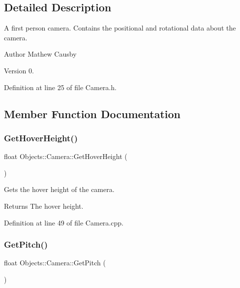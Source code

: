 \subsection{Detailed Description}
A first person camera. Contains the positional and rotational data about the camera. \begin{DoxyAuthor}{Author}
Mathew Causby 
\end{DoxyAuthor}
\begin{DoxyVersion}{Version}
0. 
\end{DoxyVersion}


Definition at line 25 of file Camera.\+h.



\subsection{Member Function Documentation}
\mbox{\label{class_objects_1_1_camera_a9a84a8e6975b39d4f7c7b9826570b329}} 
\subsubsection{\texorpdfstring{Get\+Hover\+Height()}{GetHoverHeight()}}
{\footnotesize\ttfamily float Objects\+::\+Camera\+::\+Get\+Hover\+Height (\begin{DoxyParamCaption}{ }\end{DoxyParamCaption})}

Gets the hover height of the camera. \begin{DoxyReturn}{Returns}
The hover height. 
\end{DoxyReturn}


Definition at line 49 of file Camera.\+cpp.

\mbox{\label{class_objects_1_1_camera_a8febc4d7efdd0026ea17348bc64a9c0d}} 
\subsubsection{\texorpdfstring{Get\+Pitch()}{GetPitch()}}
{\footnotesize\ttfamily float Objects\+::\+Camera\+::\+Get\+Pitch (\begin{DoxyParamCaption}{ }\end{DoxyParamCaption})}

